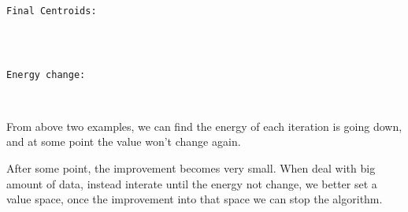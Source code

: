 \documentclass[11pt]{article}
\begin{document}
    \begin{Verbatim}[commandchars=\\\{\}]

Final Centroids:

    \end{Verbatim}

    \begin{center}
    \end{center}
    { \hspace*{\fill} \\}
    
    \begin{Verbatim}[commandchars=\\\{\}]

Energy change:

    \end{Verbatim}

    \begin{center}
    \end{center}
    { \hspace*{\fill} \\}
    
    From above two examples, we can find the energy of each iteration is
going down, and at some point the value won't change again.

After some point, the improvement becomes very small. When deal with big
amount of data, instead interate until the energy not change, we better
set a value space, once the improvement into that space we can stop the
algorithm.


    
    
    
    
\end{document}

